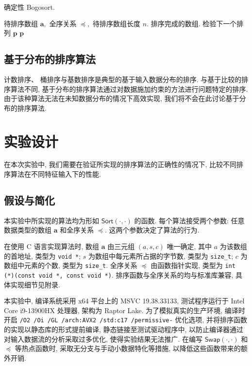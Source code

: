 \documentclass[12pt]{article}
\begin{document}
\begin{algorithm}[H]
\caption{确定性 Bogosort.}
\label{algo_bogosort_determ}
\begin{algorithmic}[1]
\Require 待排序数组 $\bm{a},$ 全序关系 $\preceq,$ 待排序数组长度 $n.$
\Ensure 排序完成的数组.
            \State 检验下一个排列 $\bm{p}$
        \EndIf
    \EndFor
    \State \Return $\bm{p}$
\EndFor
\end{algorithmic}
\end{algorithm}

\subsection{基于分布的排序算法}

计数排序、 桶排序与基数排序是典型的基于输入数据分布的排序. 与基于比较的排序算法不同, 基于分布的排序算法通过对数据施加约束的方法进行问题特定的排序. 由于该种算法无法在未知数据分布的情况下高效实现, 我们将不会在此讨论基于分布的排序算法.

\section{实验设计}

在本次实验中, 我们需要在验证所实现的排序算法的正确性的情况下, 比较不同排序算法在不同特征输入下的性能.

\subsection{假设与简化}

本实验中所实现的算法均为形如 $\mathsf{Sort}(\cdot, \cdot)$ 的函数. 每个算法接受两个参数: 任意数据类型的数组 $\bm{a}$ 和全序关系 $\preceq.$ 这两个参数决定了算法的行为.

在使用 C 语言实现算法时, 数组 $\bm{a}$ 由三元组 $(a, s, c)$ 唯一确定, 其中 $a$ 为该数组的首地址, 类型为 \texttt{void *}; $s$ 为数组中每元素所占据的字节数, 类型为 \texttt{size\_t}; $c$ 为数组中元素的个数, 类型为 \texttt{size\_t}. 全序关系 $\preceq$ 由函数指针实现, 类型为 \texttt{int (*)(const void *, const void *)}. 排序函数与全序关系的均与标准库兼容, 具体实现细节见附录.

本实验中, 编译系统采用 x64 平台上的 MSVC 19.38.33133, 测试程序运行于 Intel Core i9-13900HX 处理器, 架构为 Raptor Lake. 为了模拟真实的生产环境, 编译时开启 \texttt{/O2 /Oi /GL /arch:AVX2 /std:c17 /permissive-} 优化选项, 并将排序函数的实现以静态库的形式提前编译, 静态链接至测试驱动程序中, 以防止编译器通过对输入数据流的分析采取过多优化, 使得实验结果无法推广. 在编写 $\mathsf{Swap}(\cdot, \cdot)$ 和 $\preceq$ 等热点函数时, 采取无分支与手动小数据特化等措施, 以降低这些函数带来的额外开销.
\end{document}
